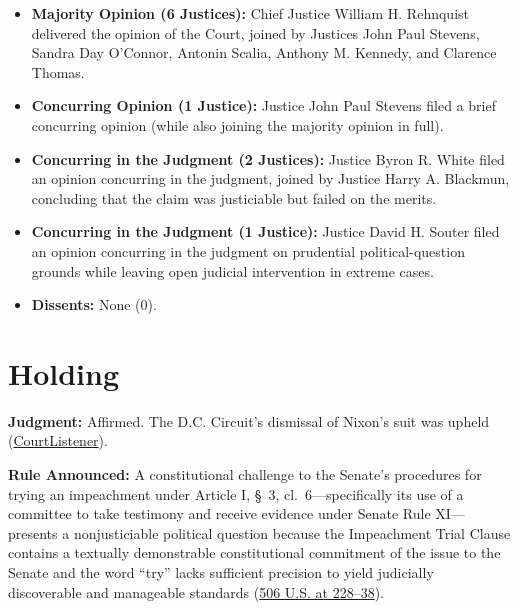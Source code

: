 \documentclass[12pt]{article}
\begin{document}
\begin{itemize}
\item \textbf{Majority Opinion (6 Justices):} Chief Justice William H. Rehnquist delivered the opinion of the Court, joined by Justices John Paul Stevens, Sandra Day O'Connor, Antonin Scalia, Anthony M. Kennedy, and Clarence Thomas.
\item \textbf{Concurring Opinion (1 Justice):} Justice John Paul Stevens filed a brief concurring opinion (while also joining the majority opinion in full).
\item \textbf{Concurring in the Judgment (2 Justices):} Justice Byron R. White filed an opinion concurring in the judgment, joined by Justice Harry A. Blackmun, concluding that the claim was justiciable but failed on the merits.
\item \textbf{Concurring in the Judgment (1 Justice):} Justice David H. Souter filed an opinion concurring in the judgment on prudential political-question grounds while leaving open judicial intervention in extreme cases.
\item \textbf{Dissents:} None (0).
\end{itemize}

\section{Holding}

\textbf{Judgment:} Affirmed. The D.C. Circuit's dismissal of Nixon's suit was upheld (\href{https://www.courtlistener.com/opinion/112803/nixon-v-united-states/}{CourtListener}).

\textbf{Rule Announced:} A constitutional challenge to the Senate's procedures for trying an impeachment under Article I, \S~3, cl.\ 6---specifically its use of a committee to take testimony and receive evidence under Senate Rule XI---presents a nonjusticiable political question because the Impeachment Trial Clause contains a textually demonstrable constitutional commitment of the issue to the Senate and the word ``try'' lacks sufficient precision to yield judicially discoverable and manageable standards (\href{https://supreme.justia.com/cases/federal/us/506/224/}{506 U.S. at 228--38}).
\end{document}
